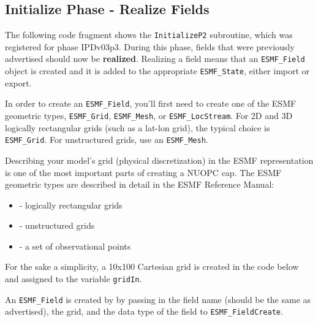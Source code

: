 
  \subsection{Initialize Phase - Realize Fields}
  \label{sec:atmexample_realizefields}
  
  
   The following code fragment shows the {\tt InitializeP2} subroutine, which
   was registered for phase IPDv03p3.   During this phase, fields that
   were previously advertised should now be \textbf{realized}.  Realizing a field
   means that an {\tt ESMF\_Field} object is created and it is added to the appropriate
   {\tt ESMF\_State}, either import or export.
  
   In order to create an {\tt ESMF\_Field}, you'll first need to create one of the
   ESMF geometric types, {\tt ESMF\_Grid}, {\tt ESMF\_Mesh}, or {\tt ESMF\_LocStream}.
   For 2D and 3D logically rectangular grids (such as a lat-lon grid), the
   typical choice is {\tt ESMF\_Grid}.  For unstructured grids, use an {\tt ESMF\_Mesh}.
  
   Describing your model's grid (physical discretization) in the
   ESMF representation is  one of the most important parts of creating
   a NUOPC cap. The ESMF geometric types are described in detail in the ESMF Reference Manual:
   \begin{itemize}
   \item {}
   - logically rectangular grids
   \item {}
   - unstructured grids
   \item {}
   - a set of observational points
   \end{itemize}
  
   For the sake a simplicity, a 10x100 Cartesian grid is created in the code below
   and assigned to the variable {\tt gridIn}.
  
   An {\tt ESMF\_Field} is created by by passing in the field
   name (should be the same as advertised), the grid, and the data type of the
   field to {\tt ESMF\_FieldCreate}.
  
